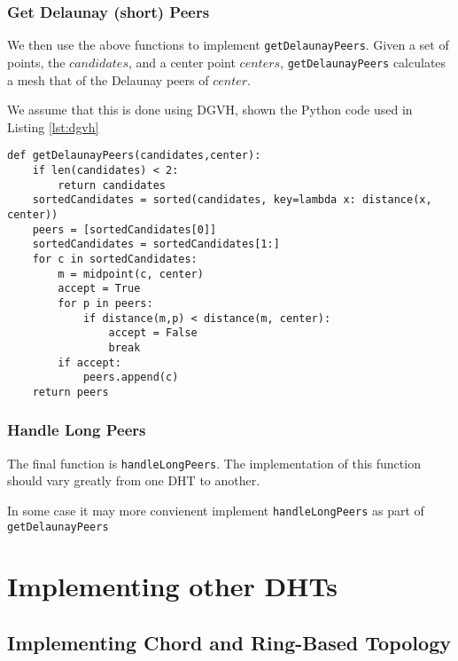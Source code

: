 \documentclass[11pt,conference]{IEEEtran}
\begin{document}
\subsubsection{Get Delaunay (short) Peers}
We then use the above functions to implement  \texttt{getDelaunayPeers}.
Given a set of points, the $ candidates$, and a center point $ centers$, \texttt{getDelaunayPeers} calculates a mesh that of the Delaunay peers of $ center$.

We assume that this is done using DGVH, shown the Python code used
in Listing \ref{lst:dgvh}

\begin{lstlisting}[basicstyle=\footnotesize\ttfamily,  breaklines=true, caption={\texttt{getDelaunayPeers()}}, label={lst:dgvh}, frame=single] 
def getDelaunayPeers(candidates,center):    
	if len(candidates) < 2:
		return candidates
	sortedCandidates = sorted(candidates, key=lambda x: distance(x, center))
	peers = [sortedCandidates[0]] 
	sortedCandidates = sortedCandidates[1:]
	for c in sortedCandidates:
		m = midpoint(c, center)
		accept = True
		for p in peers:
			if distance(m,p) < distance(m, center):  
				accept = False
				break
		if accept:
			peers.append(c)
	return peers
\end{lstlisting}


\subsubsection{Handle Long Peers}

The final function is \texttt{handleLongPeers}.
The implementation of this function should vary greatly from one DHT to another.

In some case it may more convienent implement \texttt{handleLongPeers} as part of \texttt{getDelaunayPeers}





\section{Implementing other DHTs}
\label{sec:implement}
\subsection{Implementing Chord and Ring-Based Topology}
\end{document}
